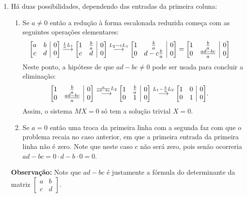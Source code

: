 \documentclass[12pt,a4paper]{article}
\makeatletter
\newenvironment{amatrix}[1]{%
  \left[\begin{array}{@{}*{#1}{c}|c@{}}
}{%
  \end{array}\right]
}
\newcommand{\grstep}[2][\relax]{%
   \ensuremath{\mathrel{
       {\mathop{\longrightarrow}\limits^{#2\mathstrut}_{
                                     \begin{subarray}{l} #1 \end{subarray}}}}}}
\makeatother
\begin{document}
\begin{enumerate}
\item Há duas possibilidades, dependendo das entradas da primeira coluna:
\begin{enumerate}
\item Se $a \neq 0$ então a redução à forma escalonada reduzida começa com as seguintes operações elementares:
\begin{align*}
\begin{amatrix}{2}
a & b & 0 \\
c & d & 0
\end{amatrix}
&
\grstep{ \frac{1}{a} L_1 }
\begin{amatrix}{2}
1 & \frac{b}{a} & 0 \\
c & d & 0
\end{amatrix}
\grstep{ L_2 - c L_1 }
\begin{amatrix}{2}
1 & \frac{b}{a} & 0 \\
0 & d-c\frac{b}{a} & 0
\end{amatrix}
=
\begin{amatrix}{2}
1 & \frac{b}{a} & 0 \\
0 & \frac{ad-bc}{a} & 0
\end{amatrix}
\end{align*}
Neste ponto, a hipótese de que $ad-bc \neq 0$ pode ser usada para concluir a eliminação:
\begin{align*}
\begin{amatrix}{2}
1 & \frac{b}{a} & 0 \\
0 & \frac{ad-bc}{a} & 0
\end{amatrix}
&
\grstep{ \frac{a}{ad-bc} L_2 }
\begin{amatrix}{2}
1 & \frac{b}{a} & 0 \\
0 & 1 & 0
\end{amatrix}
\grstep{ L_1 - \frac{b}{a} L_2 }
\begin{amatrix}{2}
1 & 0 & 0 \\
0 & 1 & 0
\end{amatrix}.
\end{align*}
Assim, o sistema $MX = 0$ só tem a solução trivial $X = 0$.

\item Se $a = 0$ então uma troca da primeira linha com a segunda faz com que o problema recaia no caso anterior, em que a primeira entrada da primeira linha não é zero. Note que neste caso $c$ não será zero, pois senão ocorreria $ad-bc = 0 \cdot d-b \cdot 0 = 0$.
\end{enumerate}
\textbf{Observação:} Note que $ad-bc$ é justamente a fórmula do determinante da matriz $\begin{bmatrix}
a & b \\
c & d
\end{bmatrix}$.
\end{enumerate}
\end{document}
